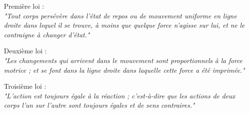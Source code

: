 ﻿\documentclass[a4paper]{article}
\begin{document}
\pagestyle{fancy}
\fancyhf{}
\setlength{\headheight}{15pt}

\begin{center}
	\large{}
\end{center}


Première loi :\\
\emph{"Tout corps persévère dans l'état de repos ou de mouvement uniforme en ligne droite dans lequel il se trouve, à moins que quelque force n'agisse sur lui, et ne le contraigne à changer d'état."}

Deuxième loi :\\
\emph{"Les changements qui arrivent dans le mouvement sont proportionnels à la force motrice ; et se font dans la ligne droite dans laquelle cette force a été imprimée."}\\

Troisième loi :\\
\emph{"L'action est toujours égale à la réaction ; c'est-à-dire que les actions de deux corps l'un sur l'autre sont toujours égales et de sens contraires."}
\end{document}
